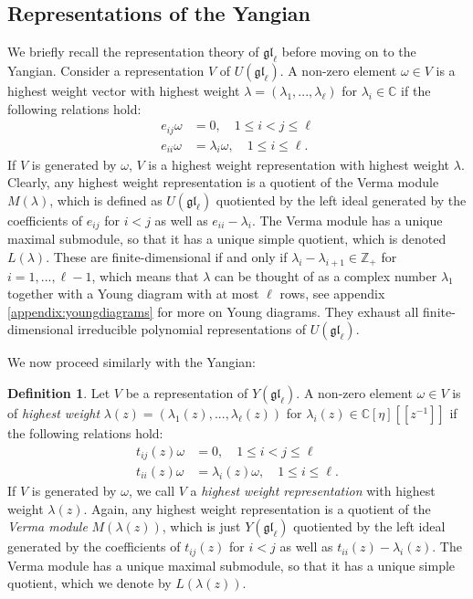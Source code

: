 \documentclass[11pt]{report}
\theoremstyle{definition}
\newtheorem{definition}[theorem]{Definition}
\theoremstyle{remark}
\theoremstyle{remark}
\newcommand{\Z}{\mathbb{Z}}
\newcommand{\C}{\mathbb{C}}
\begin{document}
\subsection{Representations of the Yangian}

We briefly recall the representation theory of $\mathfrak{gl}_\ell$ before moving on to the Yangian. Consider a representation $V$ of $U(\mathfrak{gl}_\ell)$. A non-zero element $\omega \in V$ is a highest weight vector with highest weight $\lambda = (\lambda_1,...,\lambda_\ell)$ for $\lambda_i \in \C$ if the following relations hold:
\begin{align*}
e_{ij} \omega &= 0, \quad 1 \leq i < j \leq \ell \\
e_{ii} \omega &= \lambda_i \omega, \quad 1 \leq i \leq \ell.
\end{align*}
If $V$ is generated by $\omega$, $V$ is a highest weight representation with highest weight $\lambda$. Clearly, any highest weight representation is a quotient of the Verma module $M(\lambda)$, which is defined as $U(\mathfrak{gl}_\ell)$ quotiented by the left ideal generated by the coefficients of $e_{ij}$ for $i<j$ as well as $e_{ii} - \lambda_i$. The Verma module has a unique maximal submodule, so that it has a unique simple quotient, which is denoted $L(\lambda)$. These are finite-dimensional if and only if $\lambda_i - \lambda_{i+1} \in \Z_+$ for $i=1,...,\ell-1$, which means that $\lambda$ can be thought of as a complex number $\lambda_1$ together with a Young diagram with at most $\ell$ rows, see appendix \ref{appendix:youngdiagrams} for more on Young diagrams. They exhaust all finite-dimensional irreducible polynomial representations of $U(\mathfrak{gl}_\ell)$.

We now proceed similarly with the Yangian:

\begin{definition}
Let $V$ be a representation of $Y(\mathfrak{gl}_\ell)$. A non-zero element $\omega \in V$ is of \emph{highest weight} $\lambda(z) = (\lambda_1(z),...,\lambda_\ell(z))$ for $\lambda_i(z) \in \C[\eta][[z^{-1}]]$ if the following relations hold:
\begin{align*}
t_{ij}(z) \omega &= 0, \quad 1 \leq i < j \leq \ell \\
t_{ii}(z) \omega &= \lambda_i(z) \omega, \quad 1 \leq i \leq \ell.
\end{align*}
If $V$ is generated by $\omega$, we call $V$ a \emph{highest weight representation} with highest weight $\lambda(z)$. Again, any highest weight representation is a quotient of the \emph{Verma module} $M(\lambda(z))$, which is just $Y(\mathfrak{gl}_\ell)$ quotiented by the left ideal generated by the coefficients of $t_{ij}(z)$ for $i<j$ as well as $t_{ii}(z) - \lambda_i(z)$. The Verma module has a unique maximal submodule, so that it has a unique simple quotient, which we denote by $L(\lambda(z))$.
\end{definition}
\end{document}
